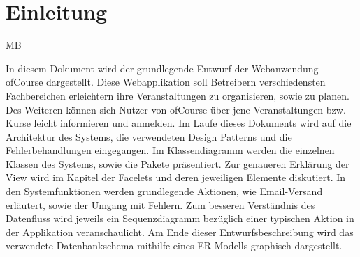 \chapter{Einleitung}
\begin{tiny}
MB \\
\end{tiny}
In diesem Dokument wird der grundlegende Entwurf der Webanwendung ofCourse dargestellt. Diese Webapplikation soll Betreibern verschiedensten Fachbereichen erleichtern ihre Veranstaltungen zu organisieren, sowie zu planen. Des Weiteren können sich Nutzer von ofCourse über jene Veranstaltungen bzw. Kurse leicht informieren und anmelden. Im Laufe dieses Dokuments wird auf die Architektur des Systems, die verwendeten Design Patterns und die Fehlerbehandlungen eingegangen. Im Klassendiagramm werden die einzelnen Klassen des Systems, sowie die Pakete präsentiert. Zur genaueren Erklärung der View wird im Kapitel der Facelets und deren jeweiligen Elemente diskutiert. In den Systemfunktionen werden grundlegende Aktionen, wie Email-Versand erläutert, sowie der Umgang mit Fehlern. Zum besseren Verständnis des Datenfluss wird jeweils ein Sequenzdiagramm bezüglich einer typischen Aktion in der Applikation veranschaulicht. 
Am Ende dieser Entwurfsbeschreibung wird das verwendete Datenbankschema mithilfe eines ER-Modells graphisch dargestellt.
